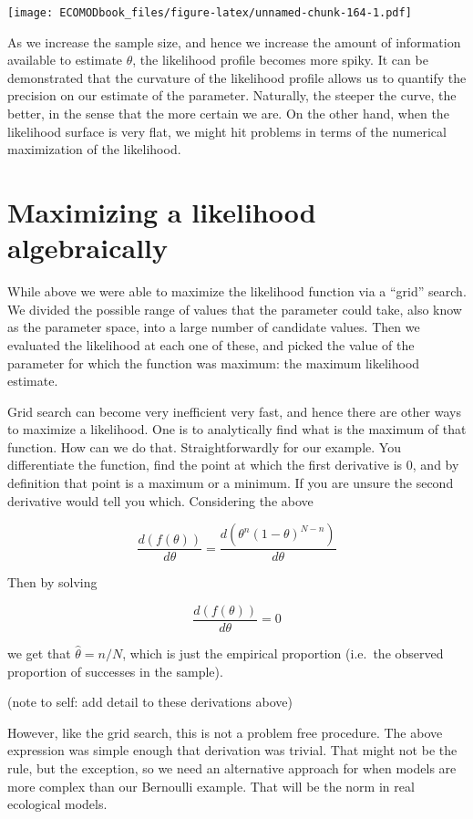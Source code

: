 \documentclass[
]{book}
\begin{document}
\texttt{[image: ECOMODbook\_files/figure-latex/unnamed-chunk-164-1.pdf]}

As we increase the sample size, and hence we increase the amount of information available to estimate \(\theta\), the likelihood profile becomes more spiky. It can be demonstrated that the curvature of the likelihood profile allows us to quantify the precision on our estimate of the parameter. Naturally, the steeper the curve, the better, in the sense that the more certain we are. On the other hand, when the likelihood surface is very flat, we might hit problems in terms of the numerical maximization of the likelihood.

\hypertarget{maximizing-a-likelihood-algebraically}{%
\section{Maximizing a likelihood algebraically}\label{maximizing-a-likelihood-algebraically}}

While above we were able to maximize the likelihood function via a ``grid'' search. We divided the possible range of values that the parameter could take, also know as the parameter space, into a large number of candidate values. Then we evaluated the likelihood at each one of these, and picked the value of the parameter for which the function was maximum: the maximum likelihood estimate.

Grid search can become very inefficient very fast, and hence there are other ways to maximize a likelihood. One is to analytically find what is the maximum of that function. How can we do that. Straightforwardly for our example. You differentiate the function, find the point at which the first derivative is 0, and by definition that point is a maximum or a minimum. If you are unsure the second derivative would tell you which. Considering the above

\[\frac{d(f(\theta))}{d \theta}=\frac{d(\theta^n (1-\theta)^{N-n})}{d \theta}\]

Then by solving

\[\frac{d(f(\theta))}{d \theta}=0\]

we get that \(\hat \theta = n/N\), which is just the empirical proportion (i.e.~the observed proportion of successes in the sample).

(note to self: add detail to these derivations above)

However, like the grid search, this is not a problem free procedure. The above expression was simple enough that derivation was trivial. That might not be the rule, but the exception, so we need an alternative approach for when models are more complex than our Bernoulli example. That will be the norm in real ecological models.
\end{document}
